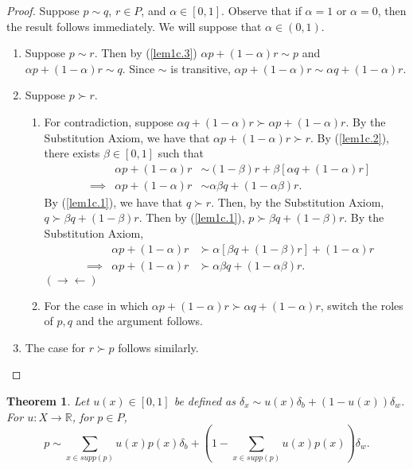 \documentclass[12pt]{article}
\newtheorem{thm}{Theorem}[section]
\theoremstyle{definition}
\theoremstyle{remark}
\def\RR{\mathbb{R}}
\def\contra{\rightarrow \leftarrow}
\begin{document}
\begin{proof}
  Suppose $p \sim q$, $r \in P$, and $\alpha \in [0,1]$. Observe that if $\alpha = 1$ or $\alpha = 0$, then the result follows immediately.
  We will suppose that $\alpha \in (0,1)$.
  \begin{enumerate}
    \item Suppose $p \sim r$. Then by (\ref{lem1c.3}) $\alpha p + (1 - \alpha)r \sim p$ and $\alpha p + (1 - \alpha)r \sim q$. Since $\sim$ is transitive, $\alpha p + (1- \alpha)r \sim \alpha q + (1 - \alpha)r$.
    \item Suppose $p \succ r$.
    \begin{enumerate}
      \item For contradiction, suppose $\alpha q + (1 - \alpha)r \succ \alpha p + (1 - \alpha)r$. By the Substitution Axiom, we have that $\alpha p + (1 - \alpha)r \succ r$.
      By (\ref{lem1c.2}), there exists $\beta \in [0,1]$ such that
      \begin{align*}
        &           & \alpha p + (1 - \alpha)r &\sim (1 - \beta)r + \beta[\alpha q + (1 - \alpha)r] \\
        & \implies  & \alpha p + (1 - \alpha)r &\sim \alpha \beta q + (1 - \alpha \beta)r.
      \end{align*}
      By (\ref{lem1c.1}), we have that $q \succ r$. Then, by the Substitution Axiom, $q \succ \beta q + (1 - \beta)r$. Then by (\ref{lem1c.1}), $p \succ \beta q + (1 - \beta)r$. By the Substitution Axiom,
      \begin{align*}
        &           & \alpha p + (1 - \alpha)r &\succ \alpha[\beta q + (1 - \beta)r] + (1 - \alpha)r \\
        & \implies  & \alpha p + (1 - \alpha)r &\succ \alpha \beta q + (1 - \alpha \beta)r.
      \end{align*}
      $(\contra)$
      \item For the case in which $\alpha p + (1 - \alpha)r \succ \alpha q + (1 - \alpha)r$, switch the roles of $p, q$ and the argument follows.
      \end{enumerate}
    \item The case for $r \succ p$ follows similarly.
  \end{enumerate}
\end{proof}
%
%
\begin{thm}
  Let $u(x) \in [0,1]$ be defined as $\delta_x \sim u(x)\delta_b + (1 - u(x))\delta_w$. For $u:X \rightarrow \RR$, for $p \in P$, $$p \sim \sum_{x \in supp(p)} u(x)p(x) \delta_b + \left( 1 - \sum_{x \in supp(p)}u(x)p(x) \right) \delta_w.$$
\end{thm}
\end{document}
